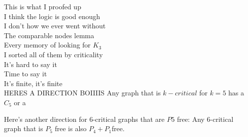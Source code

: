 \documentclass[12pt]{article}
\begin{document}
This is what I proofed up\\
I think the logic is good enough\\
I don't how we ever went without\\
The comparable nodes lemma\\
     


Every memory of looking for $K_3$\\
I sorted all of them by criticality\\
It's hard to say it\\
Time to say it\\
It's finite, it's finite\\

HERES A DIRECTION BOIIIIS
Any graph that is $k-critical$ for $k = 5$ has a $C_5$ or a 



Here's another direction for 6-critical graphs that are $P5$ free: Any 6-critical graph that is $P_5$ free is also $P_4 + P_1 $free.

{}

\end{document}
